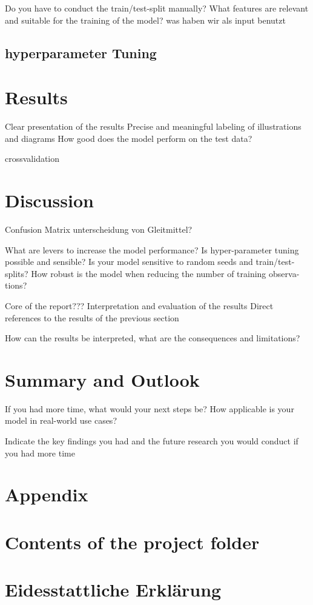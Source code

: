 \documentclass[12pt]{report}
\begin{document}
Do you have to conduct the train/test-split manually?
What features are relevant and suitable for the training of the model?
was haben wir als input benutzt

\section{hyperparameter Tuning} 
\chapter{Results}
Clear presentation of the results
Precise and meaningful labeling of illustrations and diagrams
How good does the model perform on the test data? 

crossvalidation
\chapter{Discussion}
Confusion Matrix
unterscheidung von Gleitmittel?

What are levers to increase the model performance? Is hyper-parameter tuning possible and
sensible? Is your model sensitive to random seeds and train/test-splits?
How robust is the model when reducing the number of training observa-
tions?

Core of the report???
Interpretation and evaluation of the results
Direct references to the results of the previous section

How can the results be interpreted, what are the consequences and
limitations?


\chapter{Summary and Outlook}
If you had more time, what would your next steps be? How applicable
is your model in real-world use cases?

Indicate the key findings you had and the future research you would
conduct if you had more time

\chapter{Appendix}
\printbibliography
\renewcommand{\thechapter}{\Roman{chapter}}
\setcounter{chapter}{2}
\chapter{Contents of the project folder}
\chapter{Eidesstattliche Erklärung}
\end{document}
